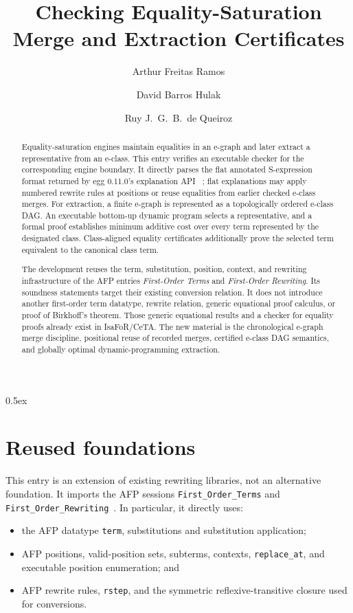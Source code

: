 \documentclass[11pt,a4paper]{article}
\begin{document}
\title{Checking Equality-Saturation Merge and Extraction Certificates}
\author{Arthur Freitas Ramos \and David Barros Hulak \and Ruy J.\ G.\ B.\ de Queiroz}
\maketitle

\begin{abstract}
Equality-saturation engines maintain equalities in an e-graph and later extract
a representative from an e-class.  This entry verifies an executable checker
for the corresponding engine boundary.  It directly parses the flat annotated
S-expression format returned by egg 0.11.0's explanation API
~\cite{egg,egg-api}; flat explanations may apply numbered rewrite rules at
positions or reuse equalities from earlier checked e-class merges.  For
extraction, a finite e-graph is represented as a topologically ordered e-class
DAG.  An executable bottom-up dynamic program selects a representative, and a
formal proof establishes minimum additive cost over every term represented by
the designated class.  Class-aligned equality certificates additionally prove
the selected term equivalent to the canonical class term.

The development reuses the term, substitution, position, context, and rewriting
infrastructure of the AFP entries \emph{First-Order Terms} and
\emph{First-Order Rewriting}.  Its soundness statements target their existing
conversion relation.  It does not introduce another first-order term datatype,
rewrite relation, generic equational proof calculus, or proof of Birkhoff's
theorem.  Those generic equational results and a checker for equality proofs
already exist in IsaFoR/CeTA.  The new material is the chronological e-graph
merge discipline, positional reuse of recorded merges, certified e-class DAG
semantics, and globally optimal dynamic-programming extraction.
\end{abstract}

\tableofcontents
\parindent 0pt\parskip 0.5ex

\section{Reused foundations}

This entry is an extension of existing rewriting libraries, not an alternative
foundation.  It imports the AFP sessions \texttt{First\_Order\_Terms} and
\texttt{First\_Order\_Rewriting}~\cite{afp-terms,afp-rewriting}.  In particular,
it directly uses:
\begin{itemize}
  \item the AFP datatype \texttt{term}, substitutions and substitution
        application;
  \item AFP positions, valid-position sets, subterms, contexts,
        \texttt{replace\_at}, and executable position enumeration; and
  \item AFP rewrite rules, \texttt{rstep}, and the symmetric reflexive-transitive
        closure used for conversions.
\end{itemize}
\end{document}
